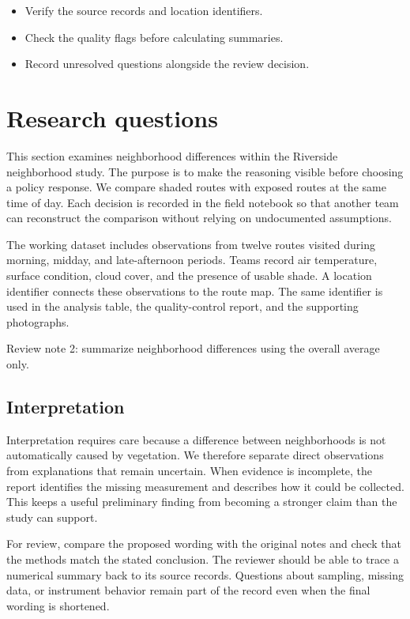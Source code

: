 \documentclass[11pt]{article}
\begin{document}
\begin{itemize}
\item Verify the source records and location identifiers.
\item Check the quality flags before calculating summaries.
\item Record unresolved questions alongside the review decision.
\end{itemize}

\section{Research questions}
This section examines neighborhood differences within the Riverside neighborhood study. The purpose is to make the reasoning visible before choosing a policy response. We compare shaded routes with exposed routes at the same time of day. Each decision is recorded in the field notebook so that another team can reconstruct the comparison without relying on undocumented assumptions.

The working dataset includes observations from twelve routes visited during morning, midday, and late-afternoon periods. Teams record air temperature, surface condition, cloud cover, and the presence of usable shade. A location identifier connects these observations to the route map. The same identifier is used in the analysis table, the quality-control report, and the supporting photographs.

Review note 2: summarize neighborhood differences using the overall average only.

\subsection{Interpretation}
Interpretation requires care because a difference between neighborhoods is not automatically caused by vegetation. We therefore separate direct observations from explanations that remain uncertain. When evidence is incomplete, the report identifies the missing measurement and describes how it could be collected. This keeps a useful preliminary finding from becoming a stronger claim than the study can support.

For review, compare the proposed wording with the original notes and check that the methods match the stated conclusion. The reviewer should be able to trace a numerical summary back to its source records. Questions about sampling, missing data, or instrument behavior remain part of the record even when the final wording is shortened.
\end{document}
